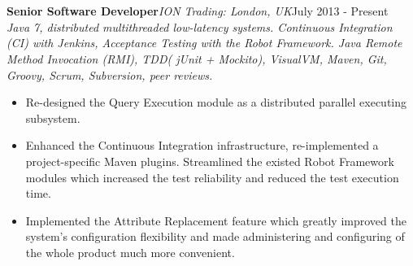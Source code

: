 \documentclass{res}
\newcommand{\jobdes}[4]{\needspace{3\baselineskip} %
{\noindent \bf #3\hspace{2ex}}{{\em \small #1}}{\hfill #2}\\{{\it \small #4.}}}
\newcommand{\osection}[1]{\section{\sc {\Large \textbf{#1}\\}} \vspace{0.30cm}}
\begin{document}
\begin{resume}
\begin{itemize}
\end{itemize}

\osection{Career History}
\jobdes{ION Trading: London, UK} {July 2013 - Present}{Senior Software Developer}
{Java 7, distributed multithreaded low-latency systems. Continuous Integration (CI) with Jenkins, Acceptance Testing with the Robot Framework. Java Remote Method Invocation (RMI), TDD( jUnit + Mockito), VisualVM, Maven, Git, Groovy, Scrum, Subversion, peer reviews}
\begin{itemize}
 \item Re-designed the Query Execution module as a distributed parallel executing subsystem.
 \item Enhanced the Continuous Integration infrastructure, re-implemented a project-specific Maven plugins. Streamlined the existed Robot Framework modules which increased the test reliability and reduced the test execution time.
 \item Implemented the Attribute Replacement feature which greatly improved the system’s configuration flexibility and made administering and configuring of the whole product much more convenient.
 \end{itemize}


\end{resume}
\end{document}
